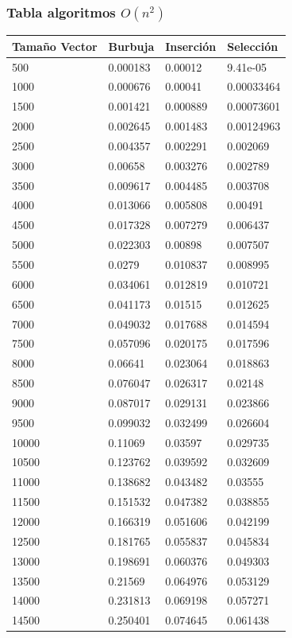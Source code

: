 \documentclass[a4paper, 11pt]{article}
\begin{document}
\subsubsection{ Tabla algoritmos $O(n^2)$}
\begin{tabular}{@{}llll@{}}
\toprule
Tamaño Vector & Burbuja  & Inserción & Selección  \\ \midrule
500           & 0.000183 & 0.00012   & 9.41e-05   \\
1000          & 0.000676 & 0.00041   & 0.00033464 \\
1500          & 0.001421 & 0.000889  & 0.00073601 \\
2000          & 0.002645 & 0.001483  & 0.00124963 \\
2500          & 0.004357 & 0.002291  & 0.002069   \\
3000          & 0.00658  & 0.003276  & 0.002789   \\
3500          & 0.009617 & 0.004485  & 0.003708   \\
4000          & 0.013066 & 0.005808  & 0.00491    \\
4500          & 0.017328 & 0.007279  & 0.006437   \\
5000          & 0.022303 & 0.00898   & 0.007507   \\
5500          & 0.0279   & 0.010837  & 0.008995   \\
6000          & 0.034061 & 0.012819  & 0.010721   \\
6500          & 0.041173 & 0.01515   & 0.012625   \\
7000          & 0.049032 & 0.017688  & 0.014594   \\
7500          & 0.057096 & 0.020175  & 0.017596   \\
8000          & 0.06641  & 0.023064  & 0.018863   \\
8500          & 0.076047 & 0.026317  & 0.02148    \\
9000          & 0.087017 & 0.029131  & 0.023866   \\
9500          & 0.099032 & 0.032499  & 0.026604   \\
10000         & 0.11069  & 0.03597   & 0.029735   \\
10500         & 0.123762 & 0.039592  & 0.032609   \\
11000         & 0.138682 & 0.043482  & 0.03555    \\
11500         & 0.151532 & 0.047382  & 0.038855   \\
12000         & 0.166319 & 0.051606  & 0.042199   \\
12500         & 0.181765 & 0.055837  & 0.045834   \\
13000         & 0.198691 & 0.060376  & 0.049303   \\
13500         & 0.21569  & 0.064976  & 0.053129   \\
14000         & 0.231813 & 0.069198  & 0.057271   \\
14500         & 0.250401 & 0.074645  & 0.061438   \\


\end{tabular}
\end{document}
